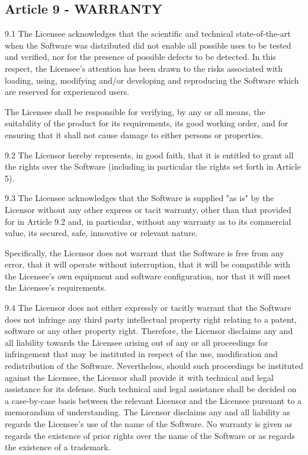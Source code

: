 \subsection*{Article 9 - WARRANTY}

9.1 The Licensee acknowledges that the scientific and technical state-of-the-art when the Software was distributed did not enable all possible uses to be tested and verified, nor for the presence of possible defects to be detected. In this respect, the Licensee's attention has been drawn to the risks associated with loading, using, modifying and/or developing and reproducing the Software which are reserved for experienced users.

The Licensee shall be responsible for verifying, by any or all means, the suitability of the product for its requirements, its good working order, and for ensuring that it shall not cause damage to either persons or properties.

9.2 The Licensor hereby represents, in good faith, that it is entitled to grant all the rights over the Software (including in particular the rights set forth in Article 5).

9.3 The Licensee acknowledges that the Software is supplied "as is" by the Licensor without any other express or tacit warranty, other than that provided for in Article 9.2 and, in particular, without any warranty as to its commercial value, its secured, safe, innovative or relevant nature.

Specifically, the Licensor does not warrant that the Software is free from any error, that it will operate without interruption, that it will be compatible with the Licensee's own equipment and software configuration, nor that it will meet the Licensee's requirements.

9.4 The Licensor does not either expressly or tacitly warrant that the Software does not infringe any third party intellectual property right relating to a patent, software or any other property right. Therefore, the Licensor disclaims any and all liability towards the Licensee arising out of any or all proceedings for infringement that may be instituted in respect of the use, modification and redistribution of the Software. Nevertheless, should such proceedings be instituted against the Licensee, the Licensor shall provide it with technical and legal assistance for its defense. Such technical and legal assistance shall be decided on a case-by-case basis between the relevant Licensor and the Licensee pursuant to a memorandum of understanding. The Licensor disclaims any and all liability as regards the Licensee's use of the name of the Software. No warranty is given as regards the existence of prior rights over the name of the Software or as regards the existence of a trademark.

